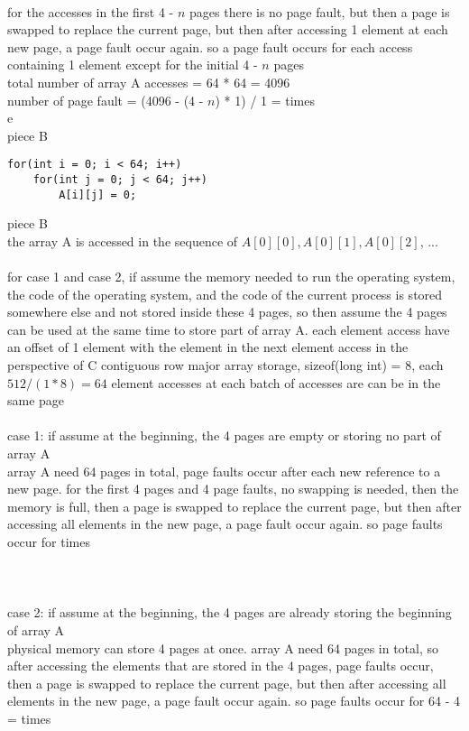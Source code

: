 \documentclass[12pt, border = 4pt, multi]{article} %
\begin{document}
\\
for the accesses in the first 4 - $n$ pages there is no page fault, but then a page is swapped to replace the current page, but then after accessing 1 element at each new page, a page fault occur again. so a page fault occurs for each access containing 1 element except for the initial 4 - $n$ pages\\
total number of array A accesses = 64 * 64 = 4096\\
number of page fault = (4096 - (4 - $n$) * 1) / 1 =  times\\
\newpage
\noindent
e\\
piece B
\begin{lstlisting}
for(int i = 0; i < 64; i++)
    for(int j = 0; j < 64; j++)
        A[i][j] = 0;
\end{lstlisting}
piece B\\
the array A is accessed in the sequence of $A[0][0], A[0][1], A[0][2]$, ...\\
\\
for case 1 and case 2, if assume the memory needed to run the operating system, the code of the operating system, and the code of the current process is stored somewhere else and not stored inside these 4 pages, so then assume the 4 pages can be used at the same time to store part of array A. each element access have an offset of 1 element with the element in the next element access in the perspective of C contiguous row major array storage, sizeof(long int) = 8, each $512 / (1 * 8) = 64$ element accesses at each batch of accesses are can be in the same page\\
\\
case 1: if assume at the beginning, the 4 pages are empty or storing no part of array A\\
array A need 64 pages in total, page faults occur after each new reference to a new page. for the first 4 pages and 4 page faults, no swapping is needed, then the memory is full, then a page is swapped to replace the current page, but then after accessing all elements in the new page, a page fault occur again. so page faults occur for  times\\ 
\\
\\
\\
case 2: if assume at the beginning, the 4 pages are already storing the beginning of array A\\
physical memory can store 4 pages at once. array A need 64 pages in total, so after accessing the elements that are stored in the 4 pages, page faults occur, then a page is swapped to replace the current page, but then after accessing all elements in the new page, a page fault occur again. so page faults occur for 64 - 4 =  times\\
\end{document}

